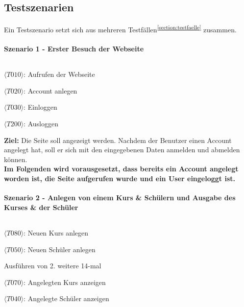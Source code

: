     \subsection{Testszenarien}
       Ein Testszenario setzt sich aus mehreren Testfällen\textsuperscript{\ref{section:testfaelle}} zusammen.
       
    \paragraph{Szenario 1 - Erster Besuch der Webseite} $~$
        
        
        \begin{test1}
            \item $\langle T010 \rangle$: Aufrufen der Webseite 
            \item $\langle T020 \rangle$: \Gls{Account} anlegen 
            \item $\langle T030 \rangle$: Einloggen 
            \item $\langle T200 \rangle$: Ausloggen 
        \end{test1}
        
        \textbf{\sffamily Ziel:} Die Seite soll angezeigt werden. Nachdem der Benutzer einen \Gls{Account} angelegt hat, soll er sich mit den eingegebenen Daten anmelden und abmelden können.\\
        
    \textbf{Im Folgenden wird vorausgesetzt, dass bereits ein \Gls{Account} angelegt worden ist, die Seite aufgerufen wurde und ein User eingeloggt ist.}
    
    \newpage
    
    \paragraph{Szenario 2 - Anlegen von einem Kurs \& Schülern und Ausgabe des Kurses \&  der Schüler} $~$ 
        
        
        \begin{test2}
            \item $\langle T080 \rangle$: Neuen Kurs anlegen
            \item $\langle T050 \rangle$: Neuen Schüler anlegen
            \item Ausführen von 2. weitere 14-mal
            \item $\langle T070 \rangle$: Angelegten Kurs anzeigen
            \item $\langle T040 \rangle$: Angelegte Schüler anzeigen
        \end{test2}
        
